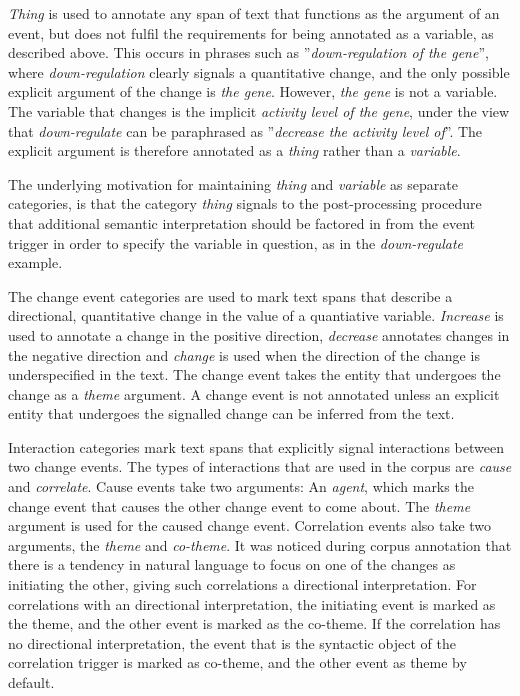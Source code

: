 \emph{Thing} is used to annotate any span of text that functions as the argument of an event, but does not fulfil the requirements for being annotated as a variable, as described above. This occurs in phrases such as ''\emph{down-regulation of the gene}'', where \emph{down-regulation} clearly signals a quantitative change, and the only possible explicit argument of the change is \emph{the gene}. However, \emph{the gene} is not a variable. The variable that changes is the implicit \emph{activity level of the gene}, under the view that \emph{down-regulate} can be paraphrased as ''\emph{decrease the activity level of}''. The explicit argument is therefore annotated as a \emph{thing} rather than a \emph{variable}.

The underlying motivation for maintaining \emph{thing} and \emph{variable} as separate categories, is that the category \emph{thing} signals to the post-processing procedure that additional semantic interpretation should be factored in from the event trigger in order to specify the variable in question, as in the \emph{down-regulate} example. 

The change event categories are used to mark text spans that describe a directional, quantitative change in the value of a quantiative variable. \emph{Increase} is used to annotate a change in the positive direction, \emph{decrease} annotates changes in the negative direction and \emph{change} is used when the direction of the change is underspecified in the text. The change event takes the entity that undergoes the change as a \emph{theme} argument. A change event is not annotated unless an explicit entity that undergoes the signalled change can be inferred from the text.

Interaction categories mark text spans that explicitly signal interactions between two change events. The types of interactions that are used in the corpus are \emph{cause} and \emph{correlate}. Cause events take two arguments: An \emph{agent}, which marks the change event that causes the other change event to come about. The \emph{theme} argument is used for the caused change event. Correlation events also take two arguments, the \emph{theme} and \emph{co-theme}. It was noticed during corpus annotation that there is a tendency in natural language to focus on one of the changes as initiating the other, giving such correlations a directional interpretation. For correlations with an directional interpretation, the initiating event is marked as the theme, and the other event is marked as the co-theme. If the correlation has no directional interpretation, the event that is the syntactic object of the correlation trigger is marked as co-theme, and the other event as theme by default.

